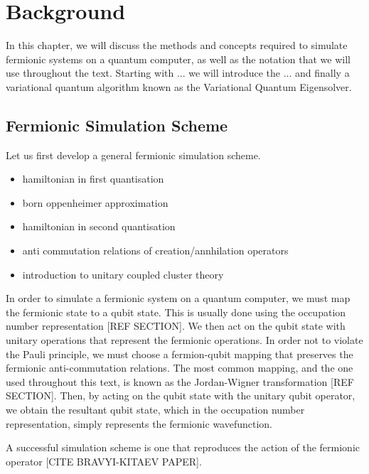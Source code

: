 \chapter{\label{background}Background}
In this chapter, we will discuss the methods and concepts required to simulate fermionic systems on a quantum computer, as well as the notation that we will use throughout the text. Starting with ... we will introduce the ... and finally a variational quantum algorithm known as the Variational Quantum Eigensolver.

\section{Fermionic Simulation Scheme}
Let us first develop a general fermionic simulation scheme.

\begin{itemize}
    \item hamiltonian in first quantisation
    \item born oppenheimer approximation
    \item hamiltonian in second quantisation
    \item anti commutation relations of creation/annhilation operators
    \item introduction to unitary coupled cluster theory
\end{itemize}

In order to simulate a fermionic system on a quantum computer, we must map the fermionic state to a qubit state. This is usually done using the occupation number representation [REF SECTION]. We then act on the qubit state with unitary operations that represent the fermionic operations. In order not to violate the Pauli principle, we must choose a fermion-qubit mapping that preserves the fermionic anti-commutation relations. The most common mapping, and the one used throughout this text, is known as the Jordan-Wigner transformation [REF SECTION]. Then, by acting on the qubit state with the unitary qubit operator, we obtain the resultant qubit state, which in the occupation number representation, simply represents the fermionic wavefunction.

A successful simulation scheme is one that reproduces the action of the fermionic operator [CITE BRAVYI-KITAEV PAPER].
